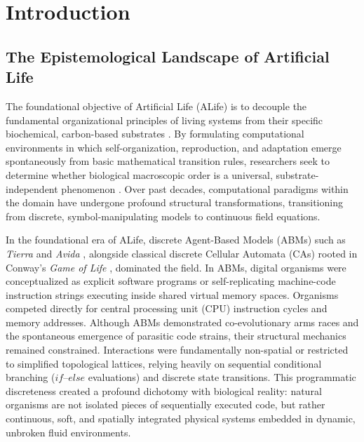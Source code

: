 \section{Introduction}
\label{sec:introduction}

\subsection{The Epistemological Landscape of Artificial Life}
\label{subsec:intro_alife_landscape}

The foundational objective of Artificial Life (ALife) is to decouple the fundamental organizational principles of living systems from their specific biochemical, carbon-based substrates \parencite{taylor2016open}. By formulating computational environments in which self-organization, reproduction, and adaptation emerge spontaneously from basic mathematical transition rules, researchers seek to determine whether biological macroscopic order is a universal, substrate-independent phenomenon \parencite{schrodinger1944what, ruiz2004universal}. Over past decades, computational paradigms within the domain have undergone profound structural transformations, transitioning from discrete, symbol-manipulating models to continuous field equations.

In the foundational era of ALife, discrete Agent-Based Models (ABMs) such as \textit{Tierra} \parencite{ray1992approach} and \textit{Avida} \parencite{adami1994evolutionary}, alongside classical discrete Cellular Automata (CAs) rooted in Conway's \textit{Game of Life} \parencite{gardner1970game}, dominated the field. In ABMs, digital organisms were conceptualized as explicit software programs or self-replicating machine-code instruction strings executing inside shared virtual memory spaces. Organisms competed directly for central processing unit (CPU) instruction cycles and memory addresses. Although ABMs demonstrated co-evolutionary arms races and the spontaneous emergence of parasitic code strains, their structural mechanics remained constrained. Interactions were fundamentally non-spatial or restricted to simplified topological lattices, relying heavily on sequential conditional branching ($if\text{--}else$ evaluations) and discrete state transitions. This programmatic discreteness created a profound dichotomy with biological reality: natural organisms are not isolated pieces of sequentially executed code, but rather continuous, soft, and spatially integrated physical systems embedded in dynamic, unbroken fluid environments.

